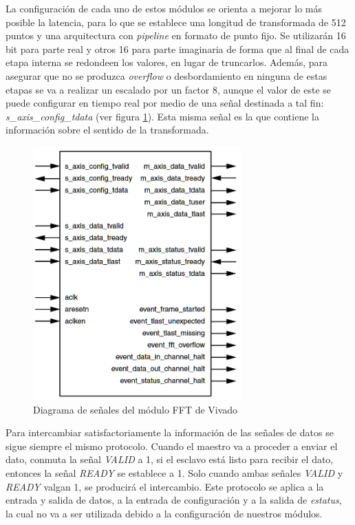 La configuración de cada uno de estos módulos se orienta a mejorar lo más posible la latencia, para lo que se establece una longitud de transformada de 512 puntos y una arquitectura con \emph{pipeline} en formato de punto fijo. Se utilizarán 16 bit para parte real y otros 16 para parte imaginaria de forma que al final de cada etapa interna se redondeen los valores, en lugar de truncarlos. Además, para asegurar que no se produzca \emph{overflow} o desbordamiento en ninguna de estas etapas se va a realizar un escalado por un factor 8, aunque el valor de este se puede configurar en tiempo real por medio de una señal destinada a tal fin: \emph{s\_axis\_config\_tdata} (ver figura \ref{fig:mod_fft}). Esta misma señal es la que contiene la información sobre el sentido de la transformada. 
\begin{figure}[!ht]
\begin{center}
\includegraphics[width=8cm]{img/modulofft.png}
\caption{\label{fig:mod_fft}Diagrama de señales del módulo FFT de Vivado}
\end{center}
\end{figure}
Para intercambiar satisfactoriamente la información de las señales de datos se sigue siempre el mismo protocolo. Cuando el maestro va a proceder a enviar el dato, conmuta la señal \emph{VALID} a 1, si el esclavo está listo para recibir el dato, entonces la señal \emph{READY} se establece a 1. Solo cuando ambas señales \emph{VALID} y \emph{READY} valgan 1, se producirá el intercambio. Este protocolo se aplica a la entrada y salida de datos, a la entrada de configuración y a la salida de \emph{estatus}, la cual no va a ser utilizada debido a la configuración de nuestros módulos.

